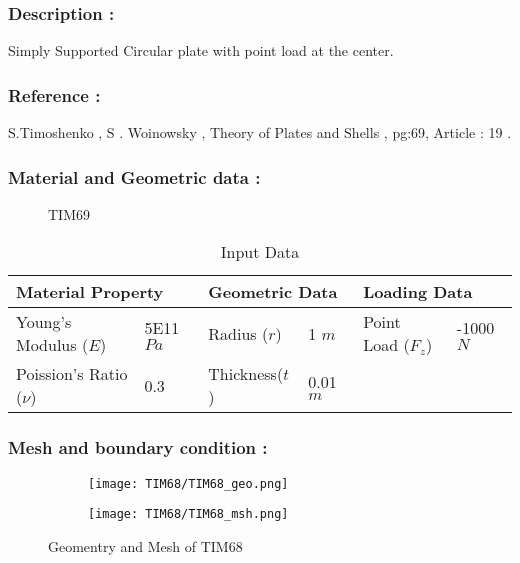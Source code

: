 \documentclass[VM.tex]{subfiles}
\begin{document}
\subsubsection*{Description : }
Simply Supported Circular plate with point load at the center.  
\subsubsection*{Reference : }
S.Timoshenko , S . Woinowsky , Theory of Plates and Shells , pg:69, Article : 19 . 
\subsubsection*{Material and Geometric data : }


\begin{figure}[h!]
\centering

\caption{TIM69}%
\end{figure}
\begin{table}[ht]
\renewcommand{\arraystretch}{1.5}
\centering
\caption{Input Data}
\begin{tabular}{|ll|ll|ll|}
\hline
\multicolumn{2}{|l|}{\cellcolor[HTML]{C0C0C0}Material Property} & \multicolumn{2}{l|}{\cellcolor[HTML]{C0C0C0}Geometric Data} & \multicolumn{2}{l|}{\cellcolor[HTML]{C0C0C0}Loading Data} \\ \hline  \hline
Young's Modulus ($E$)          & 5E11 $Pa$         & Radius ($r$)        & 1 $m$        & Point Load ($F_z$)        & -1000 $N$         \\
Poission's Ratio ($\nu$)       & 0.3         &  Thickness($t$)     &         0.01 $m$  &         &  \\ 
            \hline
\end{tabular}
\end{table}




\subsubsection*{Mesh and boundary condition : }





\begin{figure}[h!]
\begin{subfigure}{.45\textwidth}
\texttt{[image: TIM68/TIM68\_geo.png]}
\end{subfigure} \hfill
\begin{subfigure}{.45\textwidth}
\texttt{[image: TIM68/TIM68\_msh.png]}
\end{subfigure}
\caption{Geomentry and Mesh of TIM68}
\end{figure}
\end{document}
